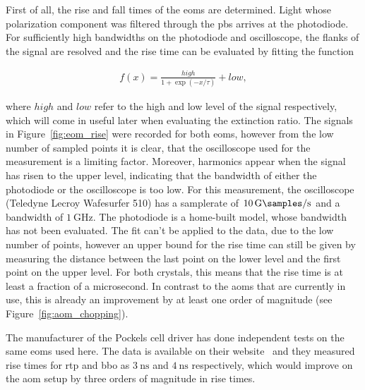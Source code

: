First of all, the rise and fall times of the \acp{eom} are determined. Light whose polarization component was filtered through the \ac{pbs} arrives at the photodiode. For sufficiently high bandwidths on the photodiode and oscilloscope, the flanks of the signal are resolved and the rise time can be evaluated by fitting the function

\begin{align}
	f(x) = \frac{high}{1 + \exp{(-x/\tau)}} + low,
\end{align}

where $high$ and $low$ refer to the high and low level of the signal respectively, which will come in useful later when evaluating the extinction ratio. The signals in Figure~\ref{fig:eom_rise} were recorded for both \acp{eom}, however from the low number of sampled points it is clear, that the oscilloscope used for the measurement is a limiting factor. Moreover, harmonics appear when the signal has risen to the upper level, indicating that the bandwidth of either the photodiode or the oscilloscope is too low. For this measurement, the oscilloscope (Teledyne Lecroy Wafesurfer 510) has a samplerate of $\SI{10}{\giga\samples\per\second}$ and a bandwidth of $\SI{1}{\giga\hertz}$. The photodiode is a home-built model, whose bandwidth has not been evaluated. The fit can't be applied to the data, due to the low number of points, however an upper bound for the rise time can still be given by measuring the distance between the last point on the lower level and the first point on the upper level. For both crystals, this means that the rise time is at least a fraction of a microsecond. In contrast to the \acp{aom} that are currently in use, this is already an improvement by at least one order of magnitude (see Figure~\ref{fig:aom_chopping}).

The manufacturer of the Pockels cell driver has done independent tests on the same \acp{eom} used here. The data is available on their website~\cite{Bergmann2020} and they measured rise times for \ac{rtp} and \ac{bbo} as $\SI{3}{\nano\second}$ and $\SI{4}{\nano\second}$ respectively, which would improve on the \ac{aom} setup by three orders of magnitude in rise times.
\begin{figure}[t]%
\end{figure}

